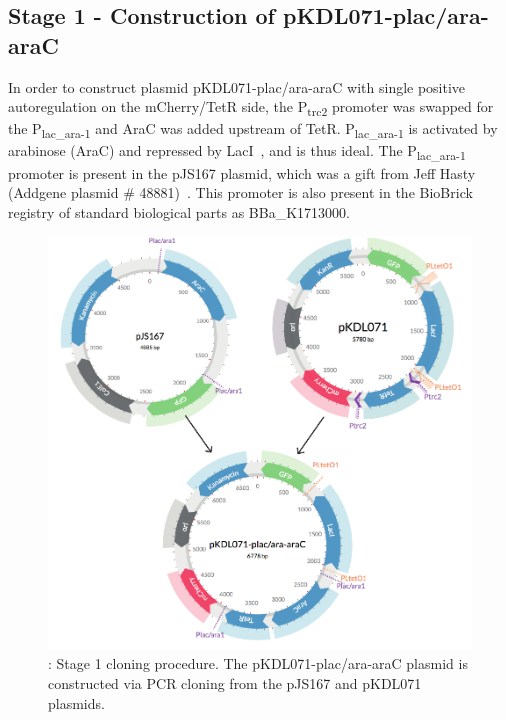 \subsection{Stage 1 - Construction of pKDL071-plac/ara-araC}

In order to construct plasmid pKDL071-plac/ara-araC with single positive autoregulation on the mCherry/TetR side, the P\textsubscript{trc2} promoter was swapped for the P\textsubscript{lac\_ara-1} and AraC was added upstream of TetR. P\textsubscript{lac\_ara-1} is activated by arabinose (AraC) and repressed by LacI~\autocite{Lutz:1997ti}, and is thus ideal. The P\textsubscript{lac\_ara-1} promoter is present in the pJS167 plasmid, which was a gift from Jeff Hasty (Addgene plasmid \# 48881)~\autocite{Stricker:2008jqa}. This promoter is also present in the BioBrick registry of standard biological parts as BBa\_K1713000. 



\begin{figure}[t]
	\begin{center}
		\includegraphics[scale=0.7]{../../chapters/chapterDesignSwitches/images/stage1_cloning.pdf}
		\caption[LoF caption]{\label{fig:stage1}: Stage 1 cloning procedure. The pKDL071-plac/ara-araC plasmid is constructed via PCR cloning from the pJS167 and pKDL071 plasmids.}
	\end{center}
\end{figure}
\clearpage

